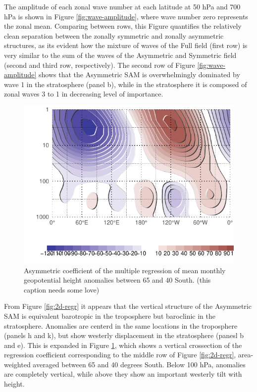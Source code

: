 \documentclass[]{ametsocV5}
\begin{document}
The amplitude of each zonal wave number at each latitude at 50 hPa and
700 hPa is shown in Figure \ref{fig:wave-amplitude}, where wave number
zero represents the zonal mean. Comparing between rows, this Figure
quantifies the relatively clean separation between the zonally symmetric
and zonally asymmetric structures, as its evident how the mixture of
waves of the Full field (first row) is very similar to the sum of the
waves of the Asymmetric and Symmetric field (second and third row,
respectively). The second row of Figure \ref{fig:wave-amplitude} shows
that the Asymmetric SAM is overwhelmingly dominated by wave 1 in the
stratosphere (panel b), while in the stratosphere it is composed of
zonal waves 3 to 1 in decreasing level of importance.

\begin{figure}
\includegraphics{vertical-regression-1} \caption[Asymmetric coefficient of the multiple regression of mean monthly geopotential height anomalies between 65 and 40 South]{Asymmetric coefficient of the multiple regression of mean monthly geopotential height anomalies between 65 and 40 South. (this caption needs some love)}\label{fig:vertical-regression}
\end{figure}

From Figure \ref{fig:2d-regr} it appears that the vertical structure of
the Asymmetric SAM is equivalent barotropic in the troposphere but
baroclinic in the stratosphere. Anomalies are centerd in the same
locations in the troposphere (panels h and k), but show westerly
displacement in the stratosphere (panesl b and e). This is expanded in
Figure \ref{fig:vertical-regression}, which shows a vertical crossection
of the regression coefficient corresponding to the middle row of Figure
\ref{fig:2d-regr}, area-weighted averaged between 65 and 40 degrees
South. Below 100 hPa, anomalies are completely vertical, while above
they show an important westerly tilt with height.
\end{document}
